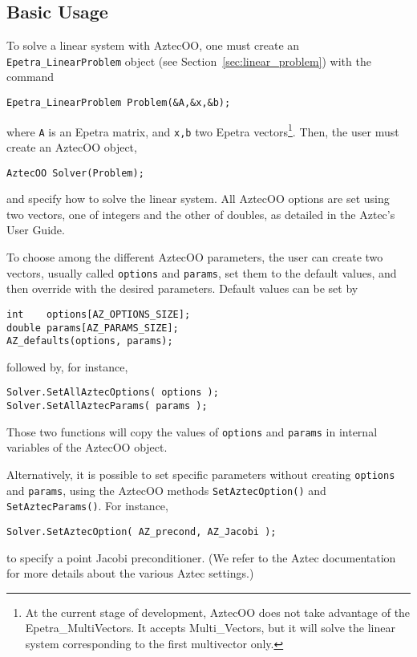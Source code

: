 
\subsection{Basic Usage}
\label{sec:basic_aztecoo}

To solve a linear system with AztecOO, one must create an
\verb!Epetra_LinearProblem!  object (see
Section~\ref{sec:linear_problem}) with the command
\begin{verbatim}
Epetra_LinearProblem Problem(&A,&x,&b);
\end{verbatim}
where \verb!A! is an Epetra matrix, and \verb!x,b! two Epetra
vectors\footnote{At the current stage of development, AztecOO does not
  take advantage of the Epetra\_MultiVectors. It accepts Multi\_Vectors,
  but it will solve the linear system corresponding to the first
  multivector only.}.  Then, the user must create an AztecOO object,
\begin{verbatim}
AztecOO Solver(Problem);
\end{verbatim}
and specify how to solve the linear system. All AztecOO options are set
using two vectors, one of integers and the other of doubles, as detailed
in the Aztec's User Guide.

To choose among the different AztecOO parameters, the user can create
two vectors, usually called \verb!options! and \verb!params!, set them
to the default values, and then override with the desired parameters.
Default values can be set by
\begin{verbatim}
int    options[AZ_OPTIONS_SIZE];
double params[AZ_PARAMS_SIZE];
AZ_defaults(options, params);
\end{verbatim}
followed by, for instance,
\begin{verbatim}
Solver.SetAllAztecOptions( options );
Solver.SetAllAztecParams( params );
\end{verbatim}
Those two functions will copy the values of \verb!options! and
\verb!params! in internal variables of the AztecOO object.

Alternatively, it is possible to set specific parameters without
creating \verb!options! and \verb!params!, using the AztecOO methods
\verb!SetAztecOption()! and \verb!SetAztecParams()!. 
For instance,
\begin{verbatim}
Solver.SetAztecOption( AZ_precond, AZ_Jacobi );
\end{verbatim}
to specify a point Jacobi preconditioner.  (We refer to the Aztec
documentation for more details about the various Aztec settings.)

